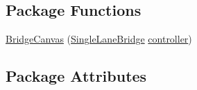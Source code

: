 \subsection*{Package Functions}
\begin{DoxyCompactItemize}
\item 
\mbox{\hyperlink{classconcurrency_1_1bridge_1_1_bridge_canvas_ad6be71b4c4f47474857fa7ab12ff2eae}{Bridge\+Canvas}} (\mbox{\hyperlink{classconcurrency_1_1bridge_1_1_single_lane_bridge}{Single\+Lane\+Bridge}} \mbox{\hyperlink{classconcurrency_1_1bridge_1_1_bridge_canvas_a97bf3b1d7ca18448f9dbffb1ad3d338b}{controller}})
\end{DoxyCompactItemize}
\subsection*{Package Attributes}
